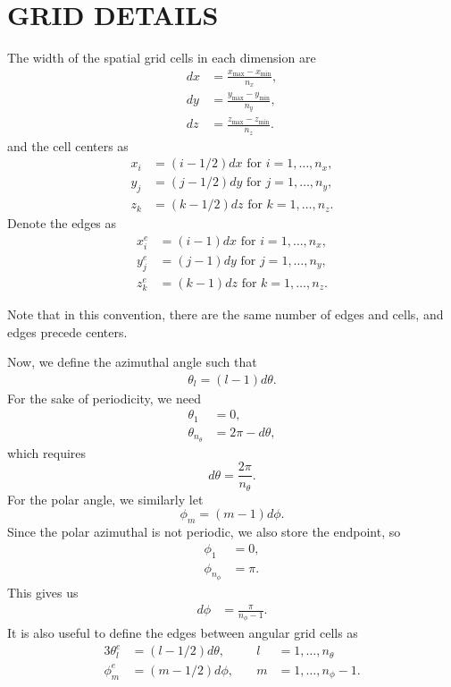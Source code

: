 \chapter{GRID DETAILS}
\label{chap:grid_details}

The width of the spatial grid cells in each dimension are
\begin{align*}
  dx &= \frac{x_{\max}-x_{\min}}{n_x}, \\
  dy &= \frac{y_{\max}-y_{\min}}{n_y}, \\
  dz &= \frac{z_{\max}-z_{\min}}{n_z}.
\end{align*}
and the cell centers as
\begin{align*}
  x_i &= (i-1/2)dx \mbox{ for } i=1,\ldots,n_x, \\
  y_j &= (j-1/2)dy \mbox{ for } j=1,\ldots,n_y, \\
  z_k &= (k-1/2)dz \mbox{ for } k=1,\ldots,n_z.
\end{align*}
Denote the edges as
\begin{align*}
  x_i^e &= (i-1)dx \mbox{ for } i=1,\ldots,n_x, \\
  y_j^e &= (j-1)dy \mbox{ for } j=1,\ldots,n_y, \\
  z_k^e &= (k-1)dz \mbox{ for } k=1,\ldots,n_z.
\end{align*}

Note that in this convention, there are the same number of edges and cells,
and edges precede centers.

Now, we define the azimuthal angle such that
\begin{align*}
  \theta_l = (l-1)d\theta.
\end{align*}
For the sake of periodicity, we need
\begin{align*}
  \theta_1 &= 0, \\
  \theta_{n_\theta} &= 2\pi-d\theta,
\end{align*}
which requires
\begin{equation*}
  d\theta = \frac{2\pi}{n_\theta}.
\end{equation*}
For the polar angle, we similarly let
\begin{equation*}
  \phi_m = (m-1)d\phi.
\end{equation*}
Since the polar azimuthal is not periodic, we also store the endpoint, so
\begin{align*}
  \phi_1 &= 0, \\
  \phi_{n_\phi} &= \pi.
\end{align*}
This gives us
\begin{align*}
  d\phi &= \frac{\pi}{n_\phi-1}.
\end{align*}
It is also useful to define the edges between angular grid cells as
\begin{alignat}{3}
  \theta_l^e &= (l-1/2) d\theta, &\quad l&=1,\ldots,n_\theta \\
  \phi_m^e &= (m-1/2) d\phi, &\quad m&=1,\ldots,n_\phi-1.
\end{alignat}

